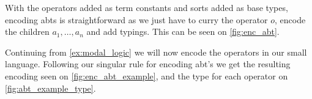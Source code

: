 \documentclass[sigplan,anonymous,review]{acmart}
\begin{document}
With the operators added as term constants and sorts added as base
types, encoding abts is straightforward as we just have to curry the
operator $o$, encode the children $a_1, \dots, a_n$ and add
typings. This can be seen on \cref{fig:enc_abt}. 


\begin{example}\label{ex:enc_abt_example}
    Continuing from \cref{ex:modal_logic} we will now encode the operators in our small language. Following our singular rule for encoding abt's we get the resulting encoding seen on \cref{fig:enc_abt_example}, and the type for each operator on \cref{fig:abt_example_type}.
    
    
    
\end{example}
\end{document}
